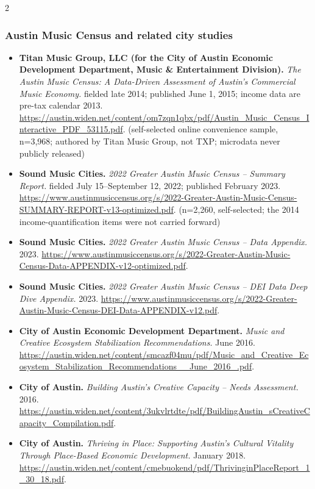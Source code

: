 {\scriptsize\renewcommand{\baselinestretch}{0.88}\selectfont\raggedright
\begin{multicols}{2}
\setlength{\parskip}{0pt}
\subsubsection*{Austin Music Census and related city studies}
\begin{itemize}[itemsep=0pt,topsep=1pt,parsep=0pt,partopsep=0pt,leftmargin=1em]
\item \textbf{Titan Music Group, LLC (for the City of Austin Economic Development Department, Music \& Entertainment Division).} \textit{The Austin Music Census: A Data-Driven Assessment of Austin’s Commercial Music Economy.} fielded late 2014; published June 1, 2015; income data are pre-tax calendar 2013. \url{https://austin.widen.net/content/om7zqn1qbx/pdf/Austin_Music_Census_Interactive_PDF_53115.pdf}. {\color{ammuted}(self-selected online convenience sample, n=3,968; authored by Titan Music Group, not TXP; microdata never publicly released)}
\item \textbf{Sound Music Cities.} \textit{2022 Greater Austin Music Census – Summary Report.} fielded July 15--September 12, 2022; published February 2023. \url{https://www.austinmusiccensus.org/s/2022-Greater-Austin-Music-Census-SUMMARY-REPORT-v13-optimized.pdf}. {\color{ammuted}(n=2,260, self-selected; the 2014 income-quantification items were not carried forward)}
\item \textbf{Sound Music Cities.} \textit{2022 Greater Austin Music Census – Data Appendix.} 2023. \url{https://www.austinmusiccensus.org/s/2022-Greater-Austin-Music-Census-Data-APPENDIX-v12-optimized.pdf}.
\item \textbf{Sound Music Cities.} \textit{2022 Greater Austin Music Census – DEI Data Deep Dive Appendix.} 2023. \url{https://www.austinmusiccensus.org/s/2022-Greater-Austin-Music-Census-DEI-Data-APPENDIX-v12.pdf}.
\item \textbf{City of Austin Economic Development Department.} \textit{Music and Creative Ecosystem Stabilization Recommendations.} June 2016. \url{https://austin.widen.net/content/smcazf04mu/pdf/Music_and_Creative_Ecosystem_Stabilization_Recommendations__June_2016_.pdf}.
\item \textbf{City of Austin.} \textit{Building Austin’s Creative Capacity – Needs Assessment.} 2016. \url{https://austin.widen.net/content/3ukvlrtdte/pdf/BuildingAustin_sCreativeCapacity_Compilation.pdf}.
\item \textbf{City of Austin.} \textit{Thriving in Place: Supporting Austin’s Cultural Vitality Through Place-Based Economic Development.} January 2018. \url{https://austin.widen.net/content/cmebuokend/pdf/ThrivinginPlaceReport_1_30_18.pdf}.

\end{itemize}
\end{multicols}}

